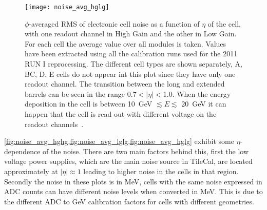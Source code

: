 \begin{figure}[!h]
  \centering
    \texttt{[image: noise\_avg\_hglg]}
    \caption{$\phi$-averaged RMS of electronic cell noise as a function of
      $\eta$ of the cell, with one readout channel in High Gain and the other in
      Low Gain. For each cell the average value over all modules is
      taken. Values have been extracted using all the calibration runs used for
      the 2011 RUN I reprocessing. The different cell types are shown
      separately, A, BC, D. E cells do not appear int this plot since they have
      only one readout channel. The transition between the long and extended
      barrels can be seen in the range $0.7 < |\eta| < 1.0$. When the energy
      deposition in the cell is between 10~GeV $\lesssim E \lesssim$ 20~GeV it
      can happen that the cell is read out with different voltage on the readout
      channels~\cite{MyTileCalPlots}.}
    \label{fig:noise_avg_hglg}
\end{figure}

\cref{fig:noise_avg_hghg,fig:noise_avg_lglg,fig:noise_avg_hglg} exhibit some
$\eta$-dependence of the noise. There are two main factors behind this, first
the low voltage power supplies, which are the main noise source in TileCal, are
located approximately at $|\eta| \approx 1$ leading to higher noise in the cells
in that region. Secondly the noise in these plots is in MeV, cells with the same
noise expressed in ADC counts can have different noise levels when converted in
MeV. This is due to the different ADC to GeV calibration factors for cells with
different geometries.

